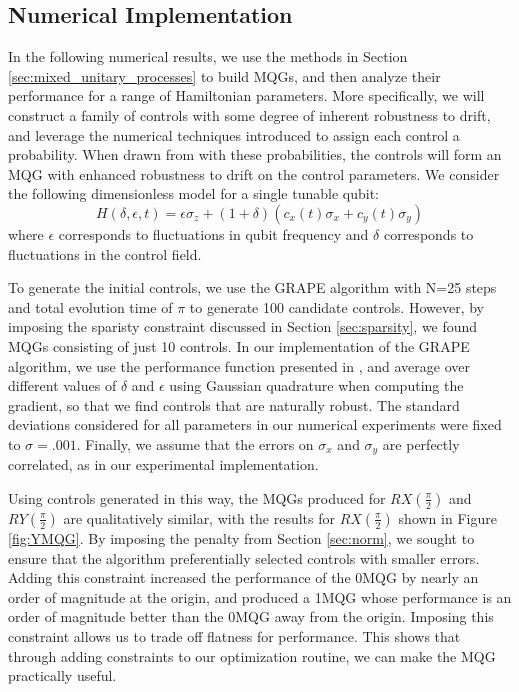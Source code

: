 \documentclass[aps,nofootinbib,pra,notitlepage,twocolumn]{revtex4-1}
\begin{document}
\subsection{Numerical Implementation}
\label{sec:numerical_results}
In the following numerical results, we use the methods in Section \ref{sec:mixed_unitary_processes} to build MQGs, and then analyze their performance for a range of Hamiltonian parameters. More specifically, we will construct a family of controls with some degree of inherent robustness to drift, and leverage the numerical techniques introduced to assign each control a probability. When drawn from with these probabilities, the controls will form an MQG with enhanced robustness to drift on the control parameters. We consider the following dimensionless model for a single tunable qubit: 
\begin{equation}\label{eq:1Qham}
  H(\delta, \epsilon, t) = \epsilon\sigma_z + (1 + \delta)(c_x(t)\sigma_x + c_y(t)\sigma_y)
\end{equation}
where $\epsilon$ corresponds to fluctuations in qubit frequency and $\delta$ corresponds to fluctuations in the control field.

To generate the initial controls, we use the GRAPE algorithm\cite{Khaneja2005} with N=25 steps and total evolution time of $\pi$ to generate 100 candidate controls. However, by imposing the sparisty constraint discussed in Section \ref{sec:sparsity}, we found MQGs consisting of just 10 controls. In our implementation of the GRAPE algorithm, we use the performance function presented in \cite{Khaneja2005}, and average over different values of $\delta$ and $\epsilon$ using Gaussian quadrature when computing the gradient, so that we find controls that are naturally robust. The standard deviations considered for all parameters in our numerical experiments were fixed to $\sigma=.001$. Finally, we assume that the errors on $\sigma_x$ and $\sigma_y$ are perfectly correlated, as in our experimental implementation.

Using controls generated in this way, the MQGs produced for $RX(\frac{\pi}{2})$ and $RY(\frac{\pi}{2})$ are qualitatively similar, with the results for $RX(\frac{\pi}{2})$ shown in Figure \ref{fig:YMQG}. By imposing the penalty from Section \ref{sec:norm}, we sought to ensure that the algorithm preferentially selected controls with smaller errors. Adding this constraint increased the performance of the 0MQG by nearly an order of magnitude at the origin, and produced a 1MQG whose performance is an order of magnitude better than the 0MQG away from the origin. Imposing this constraint allows us to trade off flatness for performance. This shows that through adding constraints to our optimization routine, we can make the MQG practically useful. 
\end{document}
